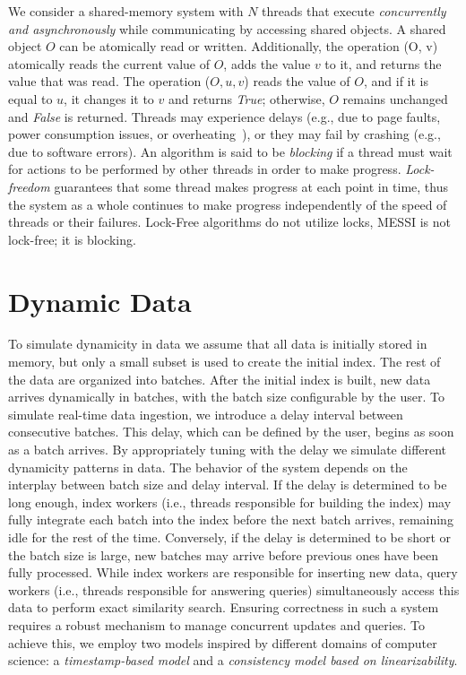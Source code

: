 We consider a shared-memory system with \( N \) threads that execute {\em concurrently
and asynchronously} while communicating by accessing shared objects. A shared object
\( O \) can be atomically read or written. Additionally, the operation \FAI(O, v)
atomically reads the current value of \( O \), adds the value \( v \) to it, and
returns the value that was read. The operation \CAS($O, u, v$) reads the value of
\( O \), and if it is equal to \( u \), it changes it to \( v \) and returns
\textit{True}; otherwise, \( O \) remains unchanged and \textit{False} is returned.
% 
Threads may experience delays (e.g., due to page faults, power consumption issues,
or overheating~\cite{inteloverheating}), or they may fail by crashing (e.g., due to
software errors). An algorithm is said to be {\em blocking} if a thread must wait for
actions to be performed by other threads in order to make progress. {\em Lock-freedom}
guarantees that some thread makes progress at each point in time, thus 
the system as a whole continues to make progress independently of the speed of threads
or their failures. Lock-Free algorithms do not utilize locks, MESSI is not lock-free;
it is blocking.


\section{Dynamic Data}  
To simulate dynamicity in data we assume that all data is initially stored in memory, but
only a small subset is used to create the initial index. The rest of the data are organized into batches.
After the initial index is built, new data arrives dynamically in batches, with the batch size
configurable by the user. To simulate real-time data ingestion, we introduce a delay interval
between consecutive batches. This delay, which can be defined by the user,
begins as soon as a batch arrives. By appropriately tuning with the delay we simulate different
dynamicity patterns in data. 
% 
The behavior of the system depends on the interplay between batch size and delay interval.
If the delay is determined to be long enough, index workers (i.e., threads responsible for building the index)
may fully integrate each batch into the index before the next batch arrives, remaining idle for
the rest of the time. Conversely, if the delay is determined to be short or the batch size is large, new batches
may arrive before previous ones have been fully processed.
% 
While index workers are responsible for inserting new data, query workers (i.e., threads
responsible for answering queries) simultaneously access this data to perform
exact similarity search. Ensuring correctness in such a system requires a robust mechanism to
manage concurrent updates and queries. To achieve this, we employ two models inspired by different
domains of computer science: a \textit{timestamp-based model} and a \textit{consistency model based
on linearizability}.  

